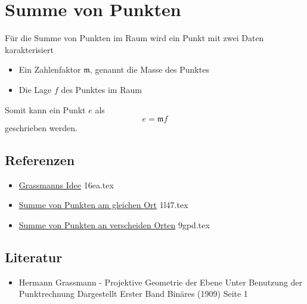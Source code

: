 \documentclass{sajzk}
\begin{document}
\section{Summe von Punkten}
\label{9wc5}

Für die Summe von Punkten im Raum wird ein Punkt mit zwei Daten karakterisiert
\begin{itemize}
    \item Ein Zahlenfaktor $\mathfrak{m}$, genannt die Masse des Punktes
    \item Die Lage $f$ des Punktes im Raum
\end{itemize}

Somit kann ein Punkt $e$ als
$$
e = \mathfrak{m}f
$$
geschrieben werden.

\subsection{Referenzen}
\begin{itemize}
    \item \href{16ea.pdf}{Grassmanns Idee} 16ea.tex
    \item \href{1l47.pdf}{Summe von Punkten am gleichen Ort} 1l47.tex
    \item \href{9gpd.pdf}{Summe von Punkten an verscheiden Orten} 9gpd.tex
\end{itemize}

\subsection{Literatur}
\begin{itemize}
    \item Hermann Grassmann - Projektive Geometrie der Ebene Unter Benutzung der Punktrechnung Dargestellt Erster Band Binäres (1909) Seite 1
\end{itemize}
\end{document}
